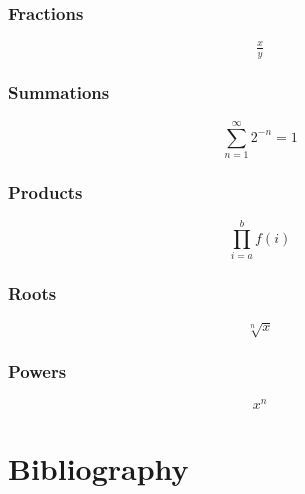 \documentclass{article}
\begin{document}
\subsubsection{Fractions}
$$\tfrac{x}{y}$$

\subsubsection{Summations}

\[ \sum_{n=1}^{\infty} 2^{-n} = 1 \]

\subsubsection{Products}
\[ \prod_{i=a}^{b} f(i) \]

\subsubsection{Roots}
$$ \sqrt[n]{x} $$

\subsubsection{Powers}
$$ x^{n} $$

\section{Bibliography}
\nocite{*}


\end{document}
